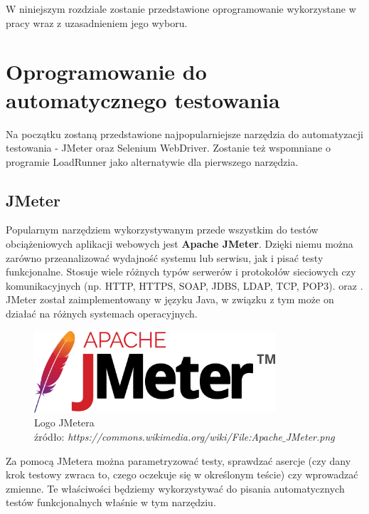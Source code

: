 W niniejszym rozdziale zostanie przedstawione oprogramowanie wykorzystane w pracy wraz z uzasadnieniem jego wyboru.

\section{Oprogramowanie do automatycznego testowania}

Na początku zostaną przedstawione najpopularniejsze narzędzia do automatyzacji testowania - JMeter oraz Selenium WebDriver. Zostanie też wspomniane o programie LoadRunner jako alternatywie dla pierwszego narzędzia.

\subsection{JMeter}

Popularnym narzędziem wykorzystywanym przede wszystkim do testów obciążeniowych aplikacji webowych jest \textbf{Apache JMeter}. Dzięki niemu można zarówno przeanalizować wydajność systemu lub serwisu, jak i pisać testy funkcjonalne. Stosuje wiele różnych typów serwerów i protokołów sieciowych czy komunikacyjnych (np. HTTP, HTTPS, SOAP, JDBS, LDAP, TCP, POP3). \cite{roman} oraz \cite{jmeter}. JMeter został zaimplementowany w języku Java, w związku z tym może on działać na różnych systemach operacyjnych.

\begin{figure}[H]
\centering
\captionsetup{justification=centering}
\includegraphics[width=0.8\textwidth]{Apache_JMeter.png}
\caption[Logo JMetera]{\label{fig:ham}Logo JMetera \\ źródło: \textit{https://commons.wikimedia.org/wiki/File:Apache$\_$JMeter.png}}
\end{figure}

Za pomocą JMetera można parametryzować testy, sprawdzać asercje (czy dany krok testowy zwraca to, czego oczekuje się w określonym teście) czy wprowadzać zmienne. Te właściwości będziemy wykorzystywać do pisania automatycznych testów funkcjonalnych właśnie w tym narzędziu.



